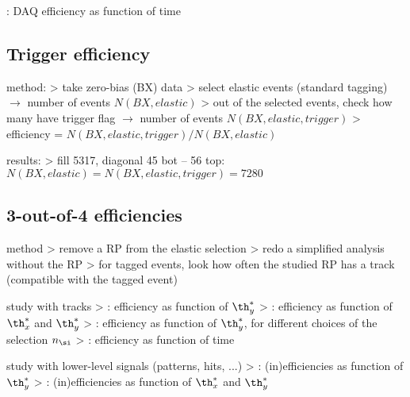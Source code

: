 \> : DAQ efficiency as function of time

\subsection{Trigger efficiency}

\> method:
\>> take zero-bias (BX) data
\>> select elastic events (standard tagging) $\rightarrow$ number of events $N(BX,elastic)$
\>> out of the selected events, check how many have trigger flag $\rightarrow$ number of events $N(BX,elastic,trigger)$
\>> efficiency = $N(BX,elastic,trigger) / N(BX,elastic)$

\> results:
\>> fill 5317, diagonal 45 bot -- 56 top: $N(BX,elastic) = N(BX,elastic,trigger) = 7280$

\subsection{3-out-of-4 efficiencies}

\> method
\>> remove a RP from the elastic selection
\>> redo a simplified analysis without the RP
\>> for tagged events, look how often the studied RP has a track (compatible with the tagged event)

\> study with tracks
\>> : efficiency as function of $\th_y^*$
\>> : efficiency as function of $\th_x^*$ and $\th_y^*$
\>> : efficiency as function of $\th_y^*$, for different choices of the selection $n_\si$
\>> : efficiency as function of time

\> study with lower-level signals (patterns, hits, ...)
\>> : (in)efficiencies as function of $\th_y^*$
\>> : (in)efficiencies as function of $\th_x^*$ and $\th_y^*$




\iffalse
\> \plot{efficiencies/eff3outof4.pdf} : single RP inefficiencies WITHOUT the cut in $\th_x^*$

\> \plot{efficiencies/eff3outof4_2D.pdf} : single RP inefficiencies as function of $\th_x^*$ and $\th_y^*$
\>> clearly indicates the inefficiency due to the horizontal RPs
\>> vertical dashed lines show the $\th_x^*$ cut to select only region with reasonable efficiency

\> \plot{efficiencies/eff3outof4_afterCut.pdf} : single RP inefficiencies WITH the cut in $\th_x^*$
\>> red: with the $\th_x^*$ cut, green: without
\>> with cut: plateau flat
\fi

